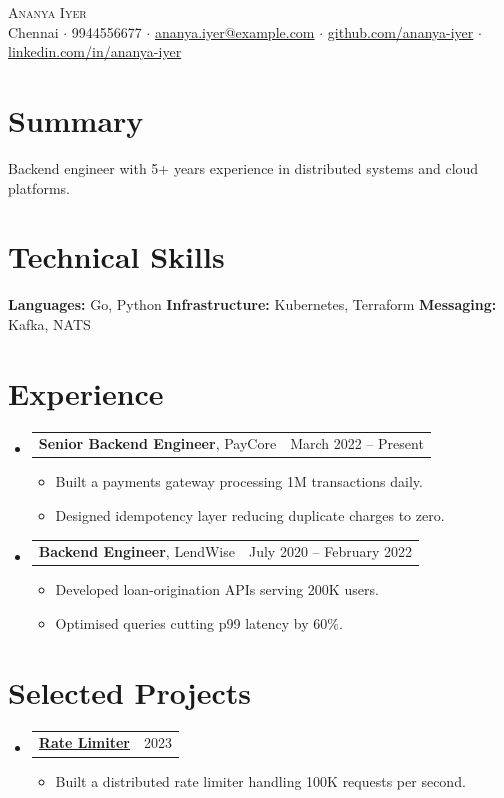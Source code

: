 \documentclass[letterpaper,11pt]{article}
\makeatletter
\newcommand{\resumeItem}[1]{%
  \item\small{#1 \vspace{-1pt}}%
}
\newcommand{\resumeSubheading}[3]{%
  \vspace{2pt}\item
    \begin{tabular*}{\linewidth}[t]{l@{\extracolsep{\fill}}r}
      \textbf{#1}, #2 & #3 \\
    \end{tabular*}\vspace{-4pt}%
}
\newcommand{\resumeProjectHeading}[2]{%
    \vspace{2pt}\item
    \begin{tabular*}{\linewidth}{l@{\extracolsep{\fill}}r}
      \small#1 & #2 \\
    \end{tabular*}\vspace{-4pt}%
}
\newcommand{\resumeSubHeadingListStart}{\begin{itemize}[leftmargin=0.15in, label={}, parsep=0pt, topsep=0pt, itemsep=4pt]}
\newcommand{\resumeSubHeadingListEnd}{\end{itemize}}
\newcommand{\resumeItemListStart}{\begin{itemize}[leftmargin=0.15in, parsep=0pt, topsep=2pt, itemsep=3pt, label=$\bullet$]}
\newcommand{\resumeItemListEnd}{\end{itemize}\vspace{-2pt}}
\makeatother
\begin{document}
\begin{center}
{\Huge \scshape Ananya Iyer} \\ \vspace{5pt}
\small Chennai $\cdot$ 9944556677 $\cdot$ \href{mailto:ananya.iyer@example.com}{ananya.iyer@example.com} $\cdot$ \href{https://github.com/ananya-iyer}{github.com/ananya-iyer} $\cdot$ \href{https://linkedin.com/in/ananya-iyer}{linkedin.com/in/ananya-iyer}
\end{center}

\section{Summary}
{\small Backend engineer with 5+ years experience in distributed systems and cloud platforms.}

\section{Technical Skills}
\begin{itemize}[leftmargin=0.15in, label={}, parsep=0pt, topsep=0pt, itemsep=0pt]
    \small{\item{
     \textbf{Languages:} Go, Python
     \textbf{Infrastructure:} Kubernetes, Terraform
     \textbf{Messaging:} Kafka, NATS
    }}
\end{itemize}

\section{Experience}
\resumeSubHeadingListStart
\resumeSubheading{Senior Backend Engineer}{PayCore}{March 2022 -- Present}
\resumeItemListStart
\resumeItem{Built a payments gateway processing 1M transactions daily.}
\resumeItem{Designed idempotency layer reducing duplicate charges to zero.}
\resumeItemListEnd
\resumeSubheading{Backend Engineer}{LendWise}{July 2020 -- February 2022}
\resumeItemListStart
\resumeItem{Developed loan-origination APIs serving 200K users.}
\resumeItem{Optimised queries cutting p99 latency by 60\%.}
\resumeItemListEnd
\resumeSubHeadingListEnd

\section{Selected Projects}
\resumeSubHeadingListStart
\resumeProjectHeading{\href{https://github.com/ananya-iyer/rate-limiter}{\textbf{Rate Limiter}}}{2023}
\resumeItemListStart
\resumeItem{Built a distributed rate limiter handling 100K requests per second.}
\resumeItemListEnd
\resumeSubHeadingListEnd
\end{document}
